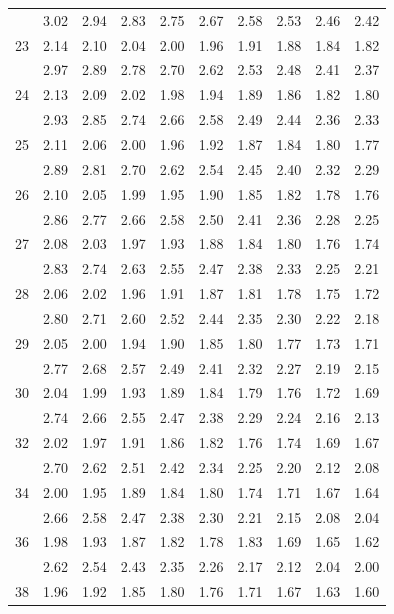 \documentclass[lang=cn,10pt]{elegantbook}
\begin{document}
\begin{longtable}{c|ccccccccc}
      & 3.02 & 2.94 & 2.83 & 2.75 & 2.67 & 2.58 & 2.53 & 2.46 & 2.42 \\
    23& 2.14 & 2.10 & 2.04 & 2.00 & 1.96 & 1.91 & 1.88 & 1.84 & 1.82 \\
      & 2.97 & 2.89 & 2.78 & 2.70 & 2.62 & 2.53 & 2.48 & 2.41 & 2.37 \\
    24& 2.13 & 2.09 & 2.02 & 1.98 & 1.94 & 1.89 & 1.86 & 1.82 & 1.80 \\
      & 2.93 & 2.85 & 2.74 & 2.66 & 2.58 & 2.49 & 2.44 & 2.36 & 2.33 \\
    25& 2.11 & 2.06 & 2.00 & 1.96 & 1.92 & 1.87 & 1.84 & 1.80 & 1.77 \\
      & 2.89 & 2.81 & 2.70 & 2.62 & 2.54 & 2.45 & 2.40 & 2.32 & 2.29 \\
    26& 2.10 & 2.05 & 1.99 & 1.95 & 1.90 & 1.85 & 1.82 & 1.78 & 1.76 \\
      & 2.86 & 2.77 & 2.66 & 2.58 & 2.50 & 2.41 & 2.36 & 2.28 & 2.25 \\
    27& 2.08 & 2.03 & 1.97 & 1.93 & 1.88 & 1.84 & 1.80 & 1.76 & 1.74 \\
      & 2.83 & 2.74 & 2.63 & 2.55 & 2.47 & 2.38 & 2.33 & 2.25 & 2.21 \\
    28& 2.06 & 2.02 & 1.96 & 1.91 & 1.87 & 1.81 & 1.78 & 1.75 & 1.72 \\
      & 2.80 & 2.71 & 2.60 & 2.52 & 2.44 & 2.35 & 2.30 & 2.22 & 2.18 \\
    29& 2.05 & 2.00 & 1.94 & 1.90 & 1.85 & 1.80 & 1.77 & 1.73 & 1.71 \\
      & 2.77 & 2.68 & 2.57 & 2.49 & 2.41 & 2.32 & 2.27 & 2.19 & 2.15 \\
    30& 2.04 & 1.99 & 1.93 & 1.89 & 1.84 & 1.79 & 1.76 & 1.72 & 1.69 \\
      & 2.74 & 2.66 & 2.55 & 2.47 & 2.38 & 2.29 & 2.24 & 2.16 & 2.13 \\
    32& 2.02 & 1.97 & 1.91 & 1.86 & 1.82 & 1.76 & 1.74 & 1.69 & 1.67 \\
      & 2.70 & 2.62 & 2.51 & 2.42 & 2.34 & 2.25 & 2.20 & 2.12 & 2.08 \\
    34& 2.00 & 1.95 & 1.89 & 1.84 & 1.80 & 1.74 & 1.71 & 1.67 & 1.64 \\
      & 2.66 & 2.58 & 2.47 & 2.38 & 2.30 & 2.21 & 2.15 & 2.08 & 2.04 \\
    36& 1.98 & 1.93 & 1.87 & 1.82 & 1.78 & 1.83 & 1.69 & 1.65 & 1.62 \\
      & 2.62 & 2.54 & 2.43 & 2.35 & 2.26 & 2.17 & 2.12 & 2.04 & 2.00 \\
    38& 1.96 & 1.92 & 1.85 & 1.80 & 1.76 & 1.71 & 1.67 & 1.63 & 1.60 \\

\end{longtable}
\end{document}
